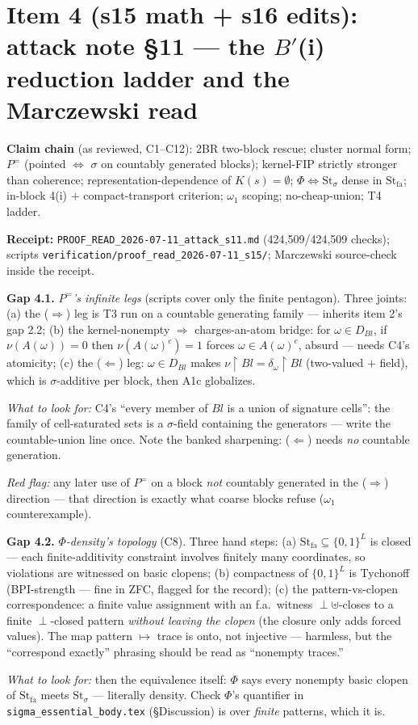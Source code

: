 \documentclass[11pt]{article}
\newcommand{\Stfa}{\mathrm{St}_{\mathrm{fa}}}
\newcommand{\Stsig}{\mathrm{St}_{\sigma}}
\newcommand{\file}[1]{\texttt{\small #1}}
\newcommand{\gap}[1]{\medskip\noindent\textbf{Gap #1.}}
\newcommand{\lookfor}{\par\smallskip\noindent\emph{What to look for:} }
\newcommand{\redflag}{\par\smallskip\noindent\emph{Red flag:} }
\begin{document}
\section{Item 4 (s15 math + s16 edits): attack note \S11 --- the
$B'$(i) reduction ladder and the Marczewski read}

\noindent\textbf{Claim chain} (as reviewed, C1--C12): 2BR two-block
rescue; cluster normal form; $P^=$ (pointed $\Leftrightarrow$
$\sigma$ on countably generated blocks); kernel-FIP strictly stronger
than coherence; representation-dependence of $K(s) = \emptyset$;
$\Phi \Leftrightarrow \Stsig$ dense in $\Stfa$; in-block 4(i) $+$
compact-transport criterion; $\omega_1$ scoping; no-cheap-union;
T4 ladder.

\noindent\textbf{Receipt:} \file{PROOF\_READ\_2026-07-11\_attack\_s11.md}
(424{,}509/424{,}509 checks); scripts
\file{verification/proof\_read\_2026-07-11\_s15/}; Marczewski
source-check inside the receipt.

\gap{4.1} \emph{$P^=$'s infinite legs} (scripts cover only the finite
pentagon). Three joints: (a) the ($\Rightarrow$) leg is T3 run on a
countable generating family --- inherits item 2's gap 2.2; (b) the
kernel-nonempty $\Rightarrow$ charges-an-atom bridge: for $\omega \in
D_{Bl}$, if $\nu(A(\omega)) = 0$ then $\nu(A(\omega)^c) = 1$ forces
$\omega \in A(\omega)^c$, absurd --- needs C4's atomicity; (c) the
($\Leftarrow$) leg: $\omega \in D_{Bl}$ makes
$\nu\!\restriction\!Bl = \delta_\omega\!\restriction\!Bl$ (two-valued
$+$ field), which is $\sigma$-additive per block, then A1c globalizes.
\lookfor C4's ``every member of $Bl$ is a union of signature cells'':
the family of cell-saturated sets is a $\sigma$-field containing the
generators --- write the countable-union line once. Note the banked
sharpening: ($\Leftarrow$) needs \emph{no} countable generation.
\redflag any later use of $P^=$ on a block \emph{not} countably
generated in the ($\Rightarrow$) direction --- that direction is
exactly what coarse blocks refuse ($\omega_1$ counterexample).

\gap{4.2} \emph{$\Phi$-density's topology} (C8). Three hand steps:
(a) $\Stfa \subseteq \{0,1\}^L$ is closed --- each finite-additivity
constraint involves finitely many coordinates, so violations are
witnessed on basic clopens; (b) compactness of $\{0,1\}^L$ is
Tychonoff (BPI-strength --- fine in ZFC, flagged for the record);
(c) the pattern-vs-clopen correspondence: a finite value assignment
with an f.a.\ witness $\perp\uplus$-closes to a finite
$\perp$-closed pattern \emph{without leaving the clopen} (the closure
only adds forced values). The map pattern $\mapsto$ trace is onto,
not injective --- harmless, but the ``correspond exactly'' phrasing
should be read as ``nonempty traces.''
\lookfor then the equivalence itself: $\Phi$ says every nonempty
basic clopen of $\Stfa$ meets $\Stsig$ --- literally density. Check
$\Phi$'s quantifier in \file{sigma\_essential\_body.tex}
(\S Discussion) is over \emph{finite} patterns, which it is.
\end{document}
